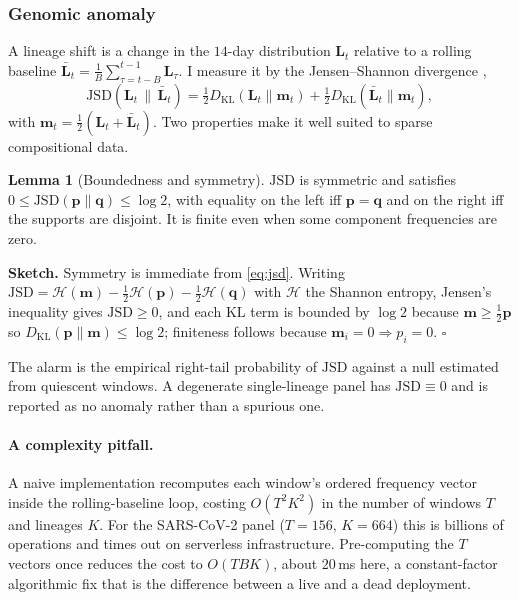 \documentclass[10pt,twocolumn]{article}
\theoremstyle{definition}
\newtheorem{lemma}{Lemma}
\newcommand{\KL}{D_{\mathrm{KL}}}
\newcommand{\jsd}{\mathrm{JSD}}
\begin{document}
\subsubsection{Genomic anomaly}
\label{sec:gen}
A lineage shift is a change in the $14$-day distribution $\mathbf L_t$ relative to
a rolling baseline $\bar{\mathbf L}_t=\frac1B\sum_{\tau=t-B}^{t-1}\mathbf L_\tau$.
I measure it by the Jensen--Shannon divergence \citep{lin1991},
\begin{equation}
\jsd(\mathbf L_t\,\|\,\bar{\mathbf L}_t)
=\tfrac12\KL(\mathbf L_t\|\mathbf m_t)+\tfrac12\KL(\bar{\mathbf L}_t\|\mathbf m_t),
\label{eq:jsd}
\end{equation}
with $\mathbf m_t=\tfrac12(\mathbf L_t+\bar{\mathbf L}_t)$. Two properties make it
well suited to sparse compositional data.
\begin{lemma}[Boundedness and symmetry]\label{lem:jsd}
$\jsd$ is symmetric and satisfies $0\le\jsd(\mathbf p\|\mathbf q)\le\log 2$, with
equality on the left iff $\mathbf p=\mathbf q$ and on the right iff the supports
are disjoint. It is finite even when some component frequencies are zero.
\end{lemma}
\noindent\textbf{Sketch.} Symmetry is immediate from \eqref{eq:jsd}. Writing
$\jsd=\mathcal H(\mathbf m)-\tfrac12\mathcal H(\mathbf p)-\tfrac12\mathcal H(\mathbf q)$
with $\mathcal H$ the Shannon entropy, Jensen's inequality gives $\jsd\ge0$, and
each KL term is bounded by $\log2$ because $\mathbf m\ge\tfrac12\mathbf p$ so
$\KL(\mathbf p\|\mathbf m)\le\log 2$; finiteness follows because $\mathbf m_i=0
\Rightarrow p_i=0$. $\square$

\noindent The alarm is the empirical right-tail probability of $\jsd$ against a
null estimated from quiescent windows. A degenerate single-lineage panel has
$\jsd\equiv0$ and is reported as no anomaly rather than a spurious one.

\paragraph{A complexity pitfall.}
A naive implementation recomputes each window's ordered frequency vector inside
the rolling-baseline loop, costing $O(T^2K^2)$ in the number of windows $T$ and
lineages $K$. For the SARS-CoV-2 panel ($T{=}156$, $K{=}664$) this is billions of
operations and times out on serverless infrastructure. Pre-computing the $T$
vectors once reduces the cost to $O(TBK)$, about $20$\,ms here, a constant-factor
algorithmic fix that is the difference between a live and a dead deployment.
\end{document}
